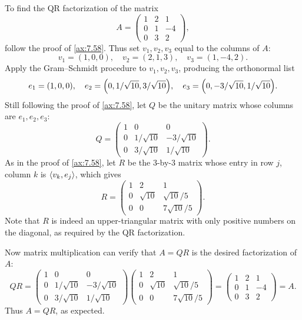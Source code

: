 \begin{example}\label{ax:7.60}
To find the QR factorization of the matrix
\[ A=\begin{pmatrix}1&2&1\\0&1&-4\\0&3&2\end{pmatrix}, \]
follow the proof of \ref{ax:7.58}. Thus set $v_1,v_2,v_3$ equal to the columns
of $A$:
\[ v_1=(1,0,0),\quad v_2=(2,1,3),\quad v_3=(1,-4,2). \]
Apply the Gram--Schmidt procedure to $v_1,v_2,v_3$, producing the orthonormal
list
\[ e_1=(1,0,0),\quad
   e_2=\Bigl(0,1/\sqrt{10},3/\sqrt{10}\Bigr),\quad
   e_3=\Bigl(0,-3/\sqrt{10},1/\sqrt{10}\Bigr). \]
Still following the proof of \ref{ax:7.58}, let $Q$ be the unitary matrix whose
columns are $e_1,e_2,e_3$:
\[ Q=\begin{pmatrix}1&0&0\\[2pt]
     0&1/\sqrt{10}&-3/\sqrt{10}\\[6pt]
     0&3/\sqrt{10}&1/\sqrt{10}\end{pmatrix}. \]
As in the proof of \ref{ax:7.58}, let $R$ be the $3$-by-$3$ matrix whose entry
in row $j$, column $k$ is $\langle v_k, e_j \rangle$, which gives
\[ R=\begin{pmatrix}1&2&1\\[2pt]
     0&\sqrt{10}&\sqrt{10}/5\\[6pt]
     0&0&7\sqrt{10}/5\end{pmatrix}. \]
Note that $R$ is indeed an upper-triangular matrix with only positive numbers on
the diagonal, as required by the QR factorization.

Now matrix multiplication can verify that $A=QR$ is the desired factorization
of $A$:
\[ QR=\begin{pmatrix}1&0&0\\[2pt]
     0&1/\sqrt{10}&-3/\sqrt{10}\\[6pt]
     0&3/\sqrt{10}&1/\sqrt{10}\end{pmatrix}
     \begin{pmatrix}1&2&1\\[2pt]
     0&\sqrt{10}&\sqrt{10}/5\\[6pt]
     0&0&7\sqrt{10}/5\end{pmatrix}
    =\begin{pmatrix}1&2&1\\0&1&-4\\0&3&2\end{pmatrix}=A. \]
Thus $A=QR$, as expected.
\end{example}

